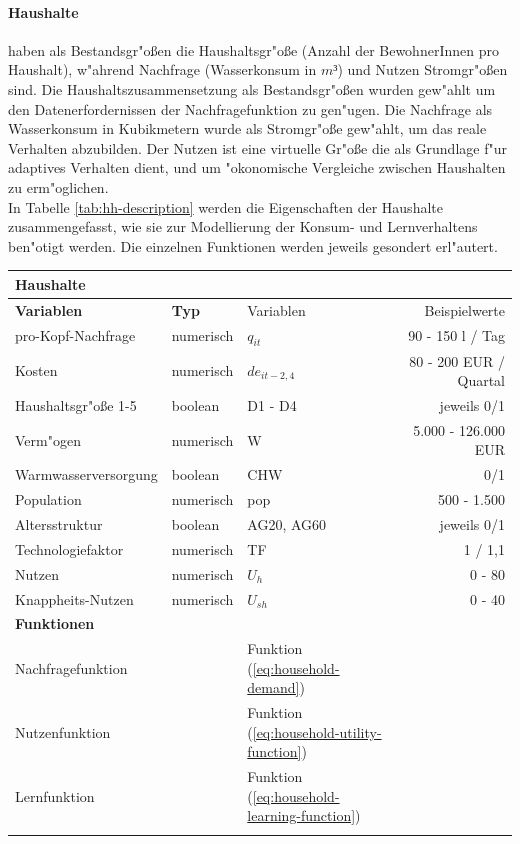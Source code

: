 \documentclass[11pt,a4paper]{article}
\begin{document}
\paragraph{Haushalte}haben als Bestandsgr"oßen die Haushaltsgr"oße (Anzahl der BewohnerInnen pro Haushalt), w"ahrend Nachfrage (Wasserkonsum in $m³$) und Nutzen Stromgr"oßen sind. Die Haushaltszusammensetzung als Bestandsgr"oßen wurden gew"ahlt um den Datenerfordernissen der Nachfragefunktion zu gen"ugen. Die Nachfrage als Wasserkonsum in Kubikmetern wurde als Stromgr"oße gew"ahlt, um das reale Verhalten abzubilden. Der Nutzen ist eine virtuelle Gr"oße die als Grundlage f"ur adaptives Verhalten dient, und um "okonomische Vergleiche zwischen Haushalten zu erm"oglichen.\\

In Tabelle \ref{tab:hh-description} werden die Eigenschaften der Haushalte zusammengefasst, wie sie zur Modellierung der Konsum- und Lernverhaltens ben"otigt werden. Die einzelnen Funktionen werden jeweils gesondert erl"autert.

\newline
\begin{tabular}{|l|l|l|r|}
\hline \textbf{Haushalte} & & & \\ 
\hline \textbf{Variablen} & \textbf{Typ} & Variablen & Beispielwerte \\ 
\hline pro-Kopf-Nachfrage & numerisch & $q_{it}$ & 90 - 150 l / Tag \\ 
\hline Kosten & numerisch &  $de_{it-2,4}$  & 80 - 200 EUR / Quartal \\ 
\hline Haushaltsgr"oße 1-5 & boolean & D1 - D4 & jeweils 0/1 \\ 
\hline Verm"ogen & numerisch & W & 5.000 - 126.000 EUR \\ 
\hline Warmwasserversorgung & boolean & CHW & 0/1\\ 
\hline Population & numerisch & pop & 500 - 1.500\\ 
\hline Altersstruktur & boolean & AG20, AG60 & jeweils 0/1\\ 
\hline Technologiefaktor & numerisch & TF & 1 / 1,1\\
\hline Nutzen & numerisch & $U_{h}$& 0 - 80\\
\hline Knappheits-Nutzen & numerisch & $U_{sh}$ & 0 - 40\\
\hline \textbf{Funktionen} & & & \\
\hline Nachfragefunktion & & Funktion (\ref{eq:household-demand}) & \\
\hline Nutzenfunktion & & Funktion (\ref{eq:household-utility-function}) & \\
\hline Lernfunktion & & Funktion (\ref{eq:household-learning-function}) & \\
\hline 
\label{tab:hh-description}
\end{tabular} 
\newline
\end{document}
